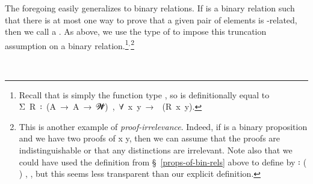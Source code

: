 The foregoing easily generalizes to binary relations.  If  is a binary relation such that there is at most one way to prove that a given pair of elements is -related, then we call  a . As above, we use the  type of \typtop to impose this truncation assumption on a binary relation.\footnote{Recall that  is simply the function type , so  is definitionally equal to \af Σ~\ab R~\af ꞉~(\ab A~\as →~\ab A~\as →~\ab 𝓦\af ̇)~\af ,~\as ∀~\ab x~\ab y~\as →~~(\ab R~\ab x~\ab y).}$^, $\footnote{%
This is another example of \emph{proof-irrelevance}. Indeed, if  is a binary proposition and we
have two proofs of  \ab x \ab y, then we can assume that the proofs are indistinguishable or that any distinctions are irrelevant. Note also that we could have used the definition  from \S~\ref{props-of-bin-rels} above to define  by   \af ꞉ (  ) ,  , but this seems less transparent than our explicit definition.}
\ccpad
\begin{code}%
\>[0]\AgdaSpace{}%
\AgdaSymbol{:}\AgdaSpace{}%
\AgdaSpace{}%
\AgdaSpace{}%
\AgdaSpace{}%
\AgdaSymbol{(}\AgdaSpace{}%
\AgdaSymbol{:}\AgdaSpace{}%
\AgdaSymbol{)}\AgdaSpace{}%
\AgdaSpace{}%
\AgdaSpace{}%
\AgdaSpace{}%
\AgdaSpace{}%
\AgdaSpace{}%
\<%
\\
\>[0]\AgdaSpace{}%
\AgdaSpace{}%
\AgdaSpace{}%
\AgdaSymbol{=}\AgdaSpace{}%
\AgdaSpace{}%
\AgdaSpace{}%
\AgdaSpace{}%
\AgdaSymbol{(}\AgdaSpace{}%
\AgdaSpace{}%
\AgdaSymbol{)}\AgdaSpace{}%
\AgdaFunction{,}\AgdaSpace{}%
\AgdaSpace{}%
\AgdaSpace{}%
\AgdaSpace{}%
\AgdaSpace{}%
\AgdaSpace{}%
\AgdaSymbol{(}\AgdaSpace{}%
\AgdaSpace{}%
\AgdaSymbol{)}\<%
\end{code}

